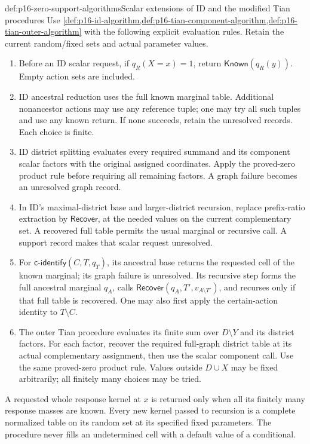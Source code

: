 \begin{hbmethod}{def:p16-zero-support-algorithms}{Scalar extensions of ID and the modified Tian procedures}
Use \cref{def:p16-id-algorithm,def:p16-tian-component-algorithm,def:p16-tian-outer-algorithm}
with the following explicit evaluation rules. Retain the current
random/fixed sets and actual parameter values.
\begin{enumerate}
\item Before an ID scalar request, if \(q_R(X=x)=1\), return
      \(\mathsf{Known}(q_R(y))\). Empty action sets are included.
\item ID ancestral reduction uses the full known marginal table.
      Additional nonancestor actions may use any reference tuple;
      one may try all such tuples and use any known return. If none
      succeeds, retain the unresolved records. Each choice is finite.
\item ID district splitting evaluates every required summand and its
      component scalar factors with the original assigned coordinates.
      Apply the proved-zero product rule before requiring all remaining
      factors. A graph failure becomes an unresolved graph record.
\item In ID's maximal-district base and larger-district recursion,
      replace prefix-ratio extraction by \(\mathsf{Recover}\),
      at the needed values on the current complementary set.
      A recovered full table permits the usual marginal or recursive
      call. A support record makes that scalar request unresolved.
\item For \(\mathsf{c\mbox{-}identify}(C,T,q_T)\), its ancestral
      base returns the requested cell of the known marginal; its
      graph failure is unresolved. Its recursive step forms the full
      ancestral marginal \(q_A\), calls
      \(\mathsf{Recover}(q_A,T',v_{A\setminus T'})\), and
      recurses only if that full table is recovered. One may also
      first apply the certain-action identity to \(T\setminus C\).
\item The outer Tian procedure evaluates its finite sum over
      \(D\setminus Y\) and its district factors. For each factor,
      recover the required full-graph district table at its actual
      complementary assignment, then use the scalar component call.
      Use the same proved-zero product rule. Values outside \(D\cup X\)
      may be fixed arbitrarily; all finitely many choices may be tried.
\end{enumerate}
A requested whole response kernel at \(x\) is returned only when
all its finitely many response masses are known. Every new kernel
passed to recursion is a complete normalized table on its random set
at its specified fixed parameters. The procedure never fills an
undetermined cell with a default value of a conditional.
\end{hbmethod}

